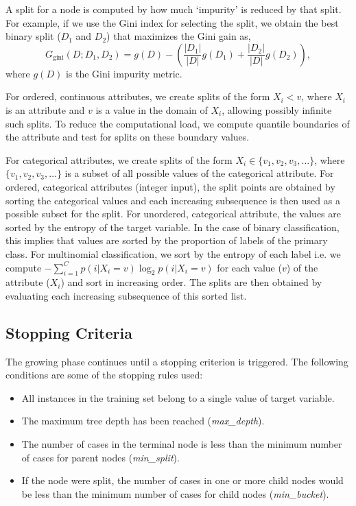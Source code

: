 A split for a node is computed by how much `impurity' is reduced by that split.
For example, if we use the Gini index for selecting the split, we obtain the best
binary split ($D_1$ and $D_2$) that maximizes the Gini gain as,
$$
    G_\text{gini}(D; D_1, D_2)= g(D) - \left( \frac{|D_1|}{|D|} g(D_1) +
                                              \frac{|D_2|}{|D|} g(D_2) \right),
$$ where $g(D)$ is the Gini impurity metric.

For ordered, continuous attributes, we create splits of the form $X_i < v$,
where $X_i$ is an attribute and $v$ is a value in the domain of $X_i$, allowing
possibly infinite such splits. To reduce the computational load, we compute
quantile boundaries of the attribute and test for splits on these boundary
values.

For categorical attributes, we create splits of the form
$X_i \in \{v_1, v_2, v_3, \ldots\}$, where $\{v_1, v_2, v_3, \ldots\}$ is
a subset of all possible values of the categorical attribute. For ordered,
categorical attributes (integer input), the split points are obtained by sorting
the categorical values and each increasing subsequence is then used as a
possible subset for the split. For unordered, categorical attribute, the values
are sorted by the entropy of the target variable. In the case of binary
classification, this implies that values are sorted by the proportion of labels
of the primary class. For multinomial classification, we sort by the entropy of
each label i.e. we compute
$-\displaystyle \sum_{i=1}^{C}p(i|X_i=v)\log_2 p(i|X_i=v)$
for each value ($v$) of the attribute ($X_i$) and sort in increasing order.
The splits are then obtained by evaluating each increasing subsequence of
this sorted list.

\subsection{Stopping Criteria} %
\label{sub:stopping_criteria}
The growing phase continues until a stopping criterion is triggered.
The following conditions are some of the stopping rules used:
\begin{itemize}
    \item All instances in the training set belong to a single value of target variable.
    \item The maximum tree depth has been reached (\emph{max\_depth}).
    \item The number of cases in the terminal node is less than the minimum
    number of cases for parent nodes (\emph{min\_split}).
    \item If the node were split, the number of cases in one or more child nodes
    would be less than the minimum number of cases for child nodes (\emph{min\_bucket}).
\end{itemize}

